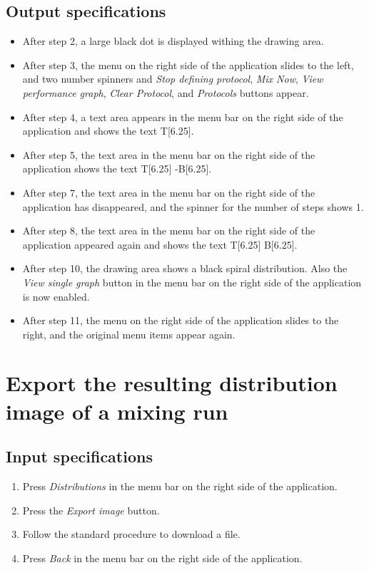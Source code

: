 \subsection*{Output specifications}
\begin{itemize}
\item After step 2, a large black dot is displayed withing the drawing area.
\item After step 3, the menu on the right side of the application slides to the left, and two number spinners and \emph{Stop defining protocol}, \emph{Mix Now}, \emph{View performance graph}, \emph{Clear Protocol}, and \emph{Protocols} buttons appear.
\item After step 4, a text area appears in the menu bar on the right side of the application and shows the text T[6.25].
\item After step 5, the text area in the menu bar on the right side of the application shows the text T[6.25] -B[6.25].

\item After step 7, the text area in the menu bar on the right side of the application has disappeared, and the spinner for the number of steps shows 1.
\item After step 8, the text area in the menu bar on the right side of the application appeared again and shows the text T[6.25] B[6.25].
\item After step 10, the drawing area shows a black spiral distribution. Also the \emph{View single graph} button in the menu bar on the right side of the application is now enabled.

\item After step 11, the menu on the right side of the application slides to the right, and the original menu items appear again.
\end{itemize}

\section{Export the resulting distribution image of a mixing run}

\subsection*{Input specifications}
\begin{enumerate}
\item Press \emph{Distributions} in the menu bar on the right side of the application.
\item Press the \emph{Export image} button.
\item Follow the standard procedure to download a file.
\item Press \emph{Back} in the menu bar on the right side of the application.
\end{enumerate}

